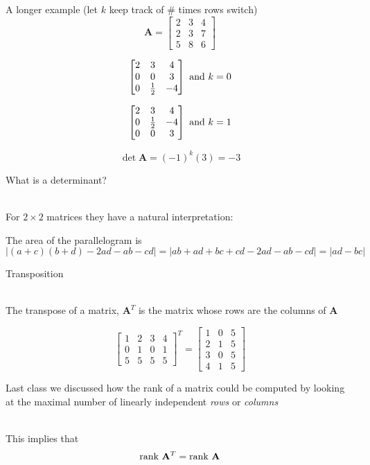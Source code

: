 \documentclass[10pt]{seminar}
\begin{document}
\begin{slide}
\newslide
A longer example (let $k$ keep track of \# times rows switch)
$$\mathbf{A}=\begin{bmatrix}2& 3& 4\\2& 3& 7\\5& 8& 6
\end{bmatrix}$$

$$\begin{bmatrix}2& 3& 4\\0& 0& 3\\0& {1\over 2}& -4
\end{bmatrix} \hbox{ and }k=0$$

$$\begin{bmatrix}2& 3& 4\\0& {1\over 2}& -4\\0& 0& 3
\end{bmatrix} \hbox{ and }k=1$$

$$\det{\mathbf{A}}=(-1)^k (3)=-3$$

\newslide
What is a determinant?

\ \\For $2\times 2$ matrices they have a natural interpretation: 

\begin{center}
\end{center}

The area of the parallelogram is $$|(a+c)(b+d)-2ad-ab-cd|=|ab+ad+bc+cd-2ad-ab-cd|=|ad-bc|$$
\newslide

Transposition

\ \\The transpose of a matrix, $\mathbf{A}^T$ is the matrix whose rows are the columns of $\mathbf{A}$

$$\begin{bmatrix}
1 & 2& 3& 4\\
0& 1& 0& 1\\
5& 5& 5& 5
\end{bmatrix}^T =
\begin{bmatrix}
1 &0 & 5\\
2& 1& 5\\
3& 0& 5\\
4& 1& 5
\end{bmatrix}
$$

\newslide

Last class we discussed how the rank of a matrix could be computed by looking at the maximal number of linearly independent \textit{rows} or \textit{columns}

\ \\This implies that $$\hbox{rank } \mathbf{A}^T=\hbox{rank } \mathbf{A}$$


\end{slide}
\end{document}
